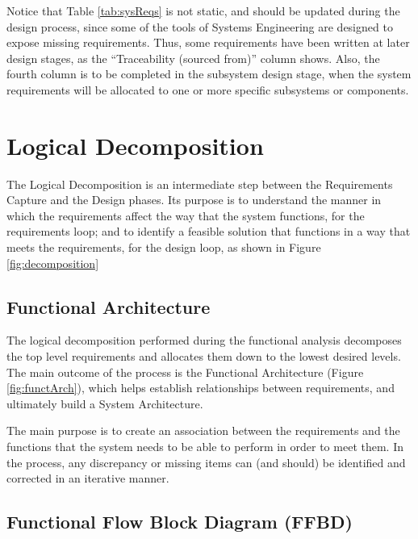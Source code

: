 

Notice that Table \ref{tab:sysReqs} is not static, and should be updated during the design process, since some of the tools of Systems Engineering are designed to expose missing requirements.
Thus, some requirements have been written at later design stages, as the ``Traceability (sourced from)'' column shows.
Also, the fourth column is to be completed in the subsystem design stage, when the system requirements will be allocated to one or more specific subsystems or components.


\section{Logical Decomposition}

The Logical Decomposition is an intermediate step between the Requirements Capture and the Design phases.
Its purpose is to understand the manner in which the requirements affect the way that the system functions, for the requirements loop; and to identify a feasible solution that functions in a way that meets the requirements, for the design loop, as shown in Figure \ref{fig:decomposition}



\subsection{Functional Architecture}

The logical decomposition performed during the functional analysis decomposes the top level requirements and allocates them down to the lowest desired levels.
The main outcome of the process is the Functional Architecture (Figure \ref{fig:functArch}), which helps establish relationships between requirements, and ultimately build a System Architecture.



The main purpose is to create an association between the requirements and the functions that the system needs to be able to perform in order to meet them.
In the process, any discrepancy or missing items can (and should) be identified and corrected in an iterative manner.

\subsection{Functional Flow Block Diagram (FFBD)}

